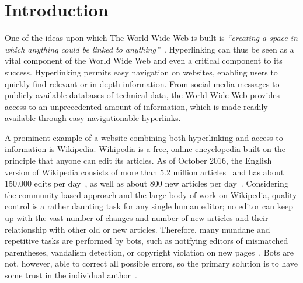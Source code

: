 \chapter{Introduction}\label{ch:introduction}
One of the ideas upon which The World Wide Web is built is \emph{``creating a space in which anything could be linked to anything''}~\cite[p.~4]{Weaving-the-web}. Hyperlinking can thus be seen as a vital component of the World Wide Web and even a critical component to its success. Hyperlinking permits easy navigation on websites, enabling users to quickly find relevant or in-depth information. From social media messages to publicly available databases of technical data, the World Wide Web provides access to an unprecedented amount of information, which is made readily available through easy navigationable hyperlinks.

A prominent example of a website combining both hyperlinking and access to information is Wikipedia. Wikipedia is a free, online encyclopedia built on the principle that anyone can edit its articles. As of October 2016, the English version of Wikipedia consists of more than 5.2 million articles~\cite{wiki-about} and has about 150.000 edits per day~\cite{wiki-num-edits}, as well as about 800 new articles per day~\cite{wmcharts}. Considering the community based approach and the large body of work on Wikipedia, quality control is a rather daunting task for any single human editor; no editor can keep up with the vast number of changes and number of new articles and their relationship with other old or new articles. Therefore, many mundane and repetitive tasks are performed by bots, such as notifying editors of mismatched parentheses, vandalism detection, or copyright violation on new pages~\cite{wiki-bots}. Bots are not, however, able to correct all possible errors, so the primary solution is to have some trust in the individual author~\cite{wiki-editor-guidelines}.

